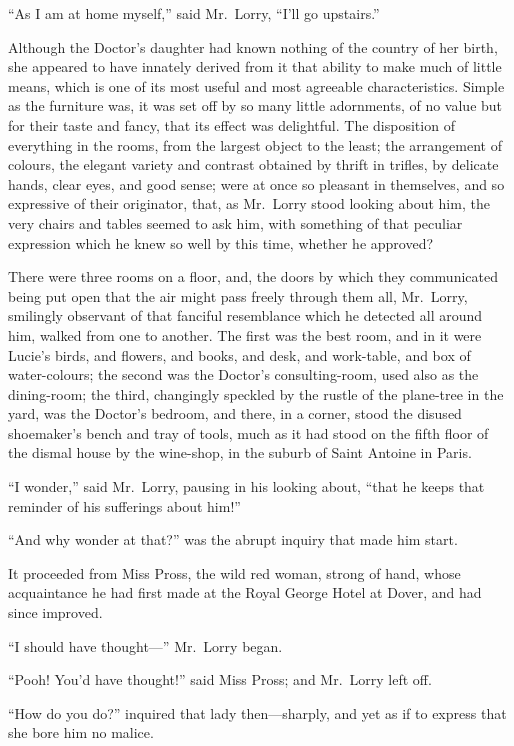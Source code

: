 ``As I am at home myself,'' said Mr.\ Lorry, ``I'll go upstairs.''

Although the Doctor's daughter had known nothing of the country of
her birth, she appeared to have innately derived from it that ability
to make much of little means, which is one of its most useful and
most agreeable characteristics.  Simple as the furniture was, it was
set off by so many little adornments, of no value but for their taste
and fancy, that its effect was delightful.  The disposition of
everything in the rooms, from the largest object to the least; the
arrangement of colours, the elegant variety and contrast obtained by
thrift in trifles, by delicate hands, clear eyes, and good sense;
were at once so pleasant in themselves, and so expressive of their
originator, that, as Mr.\ Lorry stood looking about him, the very
chairs and tables seemed to ask him, with something of that peculiar
expression which he knew so well by this time, whether he approved?

There were three rooms on a floor, and, the doors by which they
communicated being put open that the air might pass freely through
them all, Mr.\ Lorry, smilingly observant of that fanciful resemblance
which he detected all around him, walked from one to another.
The first was the best room, and in it were Lucie's birds, and flowers,
and books, and desk, and work-table, and box of water-colours;
the second was the Doctor's consulting-room, used also as the
dining-room; the third, changingly speckled by the rustle of the
plane-tree in the yard, was the Doctor's bedroom, and there, in a
corner, stood the disused shoemaker's bench and tray of tools,
much as it had stood on the fifth floor of the dismal house by the
wine-shop, in the suburb of Saint Antoine in Paris.

``I wonder,'' said Mr.\ Lorry, pausing in his looking about, ``that he
keeps that reminder of his sufferings about him!''

``And why wonder at that?'' was the abrupt inquiry that made him start.

It proceeded from Miss Pross, the wild red woman, strong of hand,
whose acquaintance he had first made at the Royal George Hotel at Dover,
and had since improved.

``I should have thought---'' Mr.\ Lorry began.

``Pooh!  You'd have thought!'' said Miss Pross; and Mr.\ Lorry left off.

``How do you do?'' inquired that lady then---sharply, and yet as if to
express that she bore him no malice.

